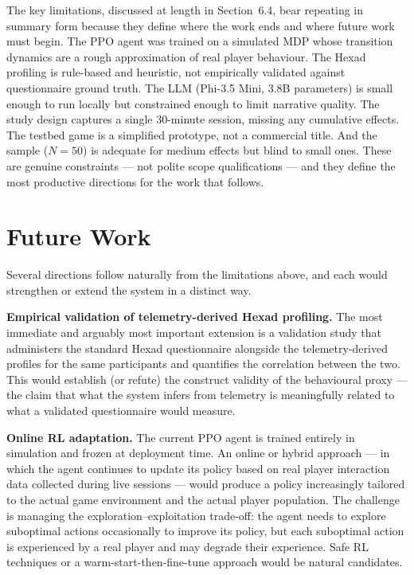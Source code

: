 The key limitations, discussed at length in Section~6.4, bear repeating in summary form because they define where the work ends and where future work must begin. The PPO agent was trained on a simulated MDP whose transition dynamics are a rough approximation of real player behaviour. The Hexad profiling is rule-based and heuristic, not empirically validated against questionnaire ground truth. The LLM (Phi-3.5 Mini, 3.8B parameters) is small enough to run locally but constrained enough to limit narrative quality. The study design captures a single 30-minute session, missing any cumulative effects. The testbed game is a simplified prototype, not a commercial title. And the sample ($N = 50$) is adequate for medium effects but blind to small ones. These are genuine constraints --- not polite scope qualifications --- and they define the most productive directions for the work that follows.

\section{Future Work}

Several directions follow naturally from the limitations above, and each would strengthen or extend the system in a distinct way.

\textbf{Empirical validation of telemetry-derived Hexad profiling.} The most immediate and arguably most important extension is a validation study that administers the standard Hexad questionnaire alongside the telemetry-derived profiles for the same participants and quantifies the correlation between the two. This would establish (or refute) the construct validity of the behavioural proxy --- the claim that what the system infers from telemetry is meaningfully related to what a validated questionnaire would measure.

\textbf{Online RL adaptation.} The current PPO agent is trained entirely in simulation and frozen at deployment time. An online or hybrid approach --- in which the agent continues to update its policy based on real player interaction data collected during live sessions --- would produce a policy increasingly tailored to the actual game environment and the actual player population. The challenge is managing the exploration--exploitation trade-off: the agent needs to explore suboptimal actions occasionally to improve its policy, but each suboptimal action is experienced by a real player and may degrade their experience. Safe RL techniques or a warm-start-then-fine-tune approach would be natural candidates.

